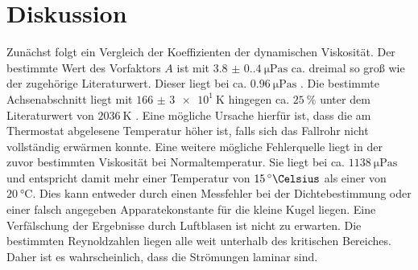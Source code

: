 
\section{Diskussion}
\label{sec:Diskussion}
Zunächst folgt ein Vergleich der Koeffizienten der dynamischen Viskosität. Der
bestimmte Wert des Vorfaktors $A$ ist mit $\SI{3.8(0.4)}{\micro\pascal\second}$ ca.
dreimal so groß wie der zugehörige Literaturwert. Dieser liegt bei ca.
$\SI{0.96}{\micro\pascal\second}$ \cite{etalit}. Die bestimmte Achsenabschnitt liegt mit
$\SI{166(3)e1}{\kelvin}$ hingegen ca. $\SI{25}{\percent}$ unter dem Literaturwert
von $\SI{2036}{\kelvin}$ \cite{etalit}. Eine mögliche Ursache hierfür ist, dass die am Thermostat
abgelesene Temperatur höher ist, falls sich das Fallrohr nicht vollständig erwärmen
konnte. Eine weitere mögliche Fehlerquelle liegt in der zuvor bestimmten Viskosität
bei Normaltemperatur. Sie liegt bei ca. $\SI{1138}{\micro\pascal\second}$ und
entspricht damit mehr einer Temperatur von $\SI{15}{\degree\Celsius}$ \cite{vislit} als einer von
$\SI{20}{\degreeCelsius}$. Dies kann entweder durch einen Messfehler bei der
Dichtebestimmung oder einer falsch angegeben Apparatekonstante für die kleine Kugel
liegen. Eine Verfälschung der Ergebnisse durch Luftblasen ist nicht zu erwarten.
Die bestimmten Reynoldzahlen liegen alle weit unterhalb des kritischen
Bereiches. Daher ist es wahrscheinlich, dass die Strömungen laminar sind.
